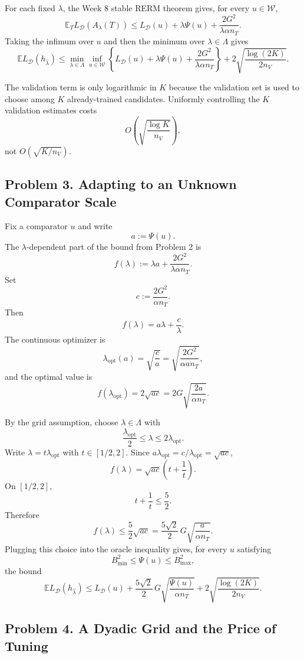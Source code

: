 \documentclass{article}
\newcommand{\EE}{\mathbb{E}}
\newcommand{\cD}{\mathcal{D}}
\newcommand{\cW}{\mathcal{W}}
\begin{document}
For each fixed $\lambda$, the Week 8 stable RERM theorem gives, for every $u\in\cW$,
$$
\EE_T L_{\cD}(A_\lambda(T))
\le
L_{\cD}(u)+\lambda\Psi(u)+\frac{2G^2}{\lambda\alpha n_T}.
$$
Taking the infimum over $u$ and then the minimum over $\lambda\in\Lambda$ gives
$$
\EE L_{\cD}(h_{\widehat{\lambda}})
\le
\min_{\lambda\in\Lambda}\inf_{u\in\cW}
\left\{
L_{\cD}(u)+\lambda\Psi(u)+\frac{2G^2}{\lambda\alpha n_T}
\right\}
+
2\sqrt{\frac{\log(2K)}{2n_V}}.
$$

The validation term is only logarithmic in $K$ because the validation set is used to choose among $K$ already-trained candidates. Uniformly controlling the $K$ validation estimates costs
$$
O\!\left(\sqrt{\frac{\log K}{n_V}}\right),
$$
not $O(\sqrt{K/n_V})$.

\subsection{Problem 3. Adapting to an Unknown Comparator Scale}

Fix a comparator $u$ and write
$$
a:=\Psi(u).
$$
The $\lambda$-dependent part of the bound from Problem 2 is
$$
f(\lambda):=\lambda a+\frac{2G^2}{\lambda\alpha n_T}.
$$
Set
$$
c:=\frac{2G^2}{\alpha n_T}.
$$
Then
$$
f(\lambda)=a\lambda+\frac{c}{\lambda}.
$$
The continuous optimizer is
$$
\lambda_{\mathrm{opt}}(a)=\sqrt{\frac{c}{a}}
=
\sqrt{\frac{2G^2}{\alpha a n_T}},
$$
and the optimal value is
$$
f(\lambda_{\mathrm{opt}})
=
2\sqrt{ac}
=
2G\sqrt{\frac{2a}{\alpha n_T}}.
$$

By the grid assumption, choose $\lambda\in\Lambda$ with
$$
\frac{\lambda_{\mathrm{opt}}}{2}\le \lambda\le 2\lambda_{\mathrm{opt}}.
$$
Write $\lambda=t\lambda_{\mathrm{opt}}$ with $t\in[1/2,2]$. Since $a\lambda_{\mathrm{opt}}=c/\lambda_{\mathrm{opt}}=\sqrt{ac}$,
$$
f(\lambda)
=
\sqrt{ac}\left(t+\frac1t\right).
$$
On $[1/2,2]$,
$$
t+\frac1t\le \frac52.
$$
Therefore
$$
f(\lambda)
\le
\frac52\sqrt{ac}
=
\frac{5\sqrt{2}}{2}\,
G\sqrt{\frac{a}{\alpha n_T}}.
$$
Plugging this choice into the oracle inequality gives, for every $u$ satisfying
$$
B_{\min}^2\le \Psi(u)\le B_{\max}^2,
$$
the bound
$$
\EE L_{\cD}(h_{\widehat{\lambda}})
\le
L_{\cD}(u)
+
\frac{5\sqrt{2}}{2}\,
G\sqrt{\frac{\Psi(u)}{\alpha n_T}}
+
2\sqrt{\frac{\log(2K)}{2n_V}}.
$$

\subsection{Problem 4. A Dyadic Grid and the Price of Tuning}
\end{document}
